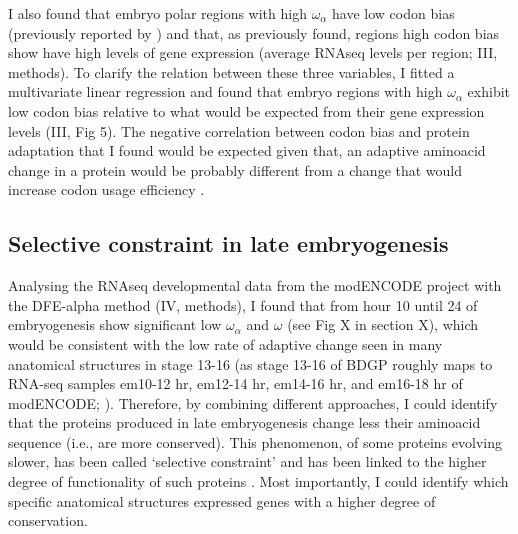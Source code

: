 I also found that embryo polar regions with high $\omega_{\alpha}$ have low codon bias (previously reported by  \citealp{Sharp1991,Betancourt2002,Haerty2007}) and that, as \citet{Plotkin2011} previously found, regions high codon bias show have high levels of gene expression (average RNAseq levels per region; III, methods).
To clarify the relation between these three variables, I fitted a multivariate linear regression and found that embryo regions with high $\omega_{\alpha}$ exhibit low codon bias relative to what would be expected from their gene expression levels (III, Fig 5).
The negative correlation between codon bias and protein adaptation that I found would be expected given that, an adaptive  aminoacid change in a protein would be probably different from a change that would increase codon usage efficiency \citep{Hershberg2008,Presnyak2015}.

\subsection{Selective constraint in late embryogenesis} \label{OmegaA_late_embryo}

Analysing the RNAseq developmental data from the modENCODE project \citep{Graveley2011} with the DFE-alpha method (IV, methods), I found that from hour 10 until 24 of embryogenesis show significant low $\omega_{\alpha}$ and $\omega$ (see Fig X in section X), which would be consistent with the low rate of adaptive change seen in many anatomical structures in stage 13-16 (as stage 13-16 of BDGP roughly maps to RNA-seq samples em10-12 hr, em12-14 hr, em14-16 hr, and em16-18 hr of modENCODE; \citealp{Hammonds2013}).
Therefore, by combining different approaches, I could identify that the proteins produced in late embryogenesis change less their aminoacid sequence (i.e., are more conserved). This phenomenon, of some proteins evolving slower, has been called `selective constraint' and has been linked to the higher degree of functionality of such proteins \citep{kimura1983neutral}.
Most importantly, I could identify which specific anatomical structures expressed genes with a higher degree of conservation.